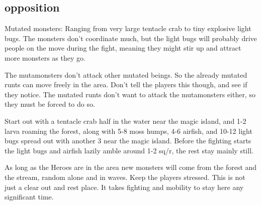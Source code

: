 \subsection*{opposition}

Mutated monsters: Ranging from very large tentacle crab to tiny explosive light bugs. The monsters don't coordinate much, but the light bugs will probably drive people on the move during the fight, meaning they might stir up and attract more monsters as they go.

The mutamonsters don't attack other mutated beings. So the already mutated runts can move freely in the area. Don't tell the players this though, and see if they notice. The mutated runts don't want to attack the mutamonsters either, so they must be forced to do so.

Start out with a tentacle crab half in the water near the magic island, and 1-2 larva roaming the forest, along with 5-8 moss humps, 4-6 airfish, and 10-12 light bugs spread out with another 3 near the magic island.
Before the fighting starts the light bugs and airfish lazily amble around 1-2 sq/r, the rest stay mainly still.

As long as the Heroes are in the area new monsters will come from the forest and the stream, random alone and in waves. Keep the players stressed. This is not just a clear out and rest place. It takes fighting and mobility to stay here any significant time.

